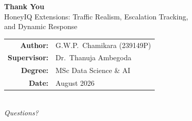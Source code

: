 \documentclass[aspectratio=169, 12pt]{beamer}
\begin{document}
\begin{frame}[plain]
  \begin{center}
    \vspace{1.5cm}
    {\Huge\textbf{Thank You}}\\[1cm]
    {\large HoneyIQ Extensions: Traffic Realism, Escalation Tracking,\\
    and Dynamic Response}\\[1cm]
    \begin{tabular}{rl}
      \textbf{Author:}     & G.W.P.\ Chamikara (239149P) \\
      \textbf{Supervisor:} & Dr.\ Thanuja Ambegoda \\
      \textbf{Degree:}     & MSc Data Science \& AI \\
      \textbf{Date:}       & August 2026 \\
    \end{tabular}\\[1cm]
    {\large\textit{Questions?}}
  \end{center}
\end{frame}
\end{document}
